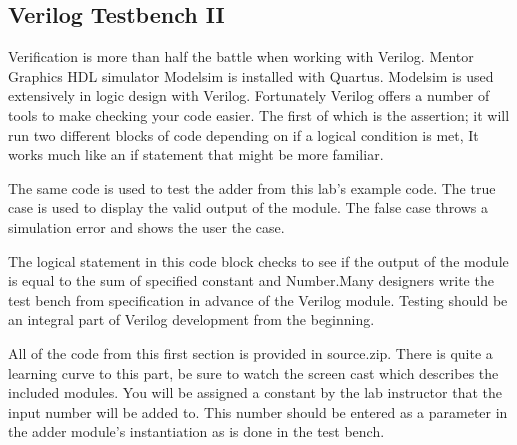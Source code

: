   \subsection{Verilog Testbench II}
    Verification is more than half the battle when working with Verilog. Mentor Graphics HDL simulator Modelsim is installed with Quartus. Modelsim is used extensively in logic design with Verilog. Fortunately Verilog offers a number of tools to make checking your code easier. The first of which is the assertion; it will run two different blocks of code depending on if a logical condition is met, It works much like an if statement that might be more familiar.
    

    The same code is used to test the adder from this lab's example code. The true case is used to display the valid output of the module. The false case throws a simulation error and shows the user the case. 
    

    The logical statement in this code block checks to see if the output of the module is equal to the sum of specified constant and Number.Many designers write the test bench from specification in advance of the Verilog module. Testing should be an integral part of Verilog development from the beginning.

    All of the code from this first section is provided in source.zip. There is quite a learning curve to this part, be sure to watch the screen cast which describes the included modules. You will be assigned a constant by the lab instructor that the input number will be added to. This number should be entered as a parameter in the adder module's instantiation as is done in the test bench.


